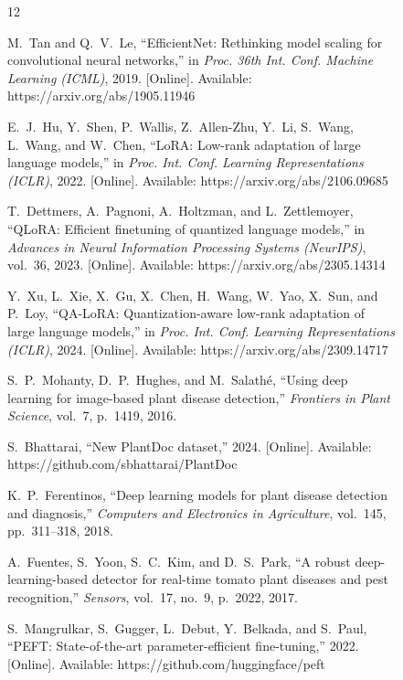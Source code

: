 \documentclass[conference]{IEEEtran}
\begin{document}
\begin{figure}[htbp]
\balance

\begin{thebibliography}{12}

M.~Tan and Q.~V.~Le,
``EfficientNet: Rethinking model scaling for convolutional neural networks,''
in \emph{Proc. 36th Int. Conf. Machine Learning (ICML)}, 2019.
[Online]. Available: https://arxiv.org/abs/1905.11946

E.~J.~Hu, Y.~Shen, P.~Wallis, Z.~Allen-Zhu, Y.~Li, S.~Wang, L.~Wang, and W.~Chen,
``LoRA: Low-rank adaptation of large language models,''
in \emph{Proc. Int. Conf. Learning Representations (ICLR)}, 2022.
[Online]. Available: https://arxiv.org/abs/2106.09685

T.~Dettmers, A.~Pagnoni, A.~Holtzman, and L.~Zettlemoyer,
``QLoRA: Efficient finetuning of quantized language models,''
in \emph{Advances in Neural Information Processing Systems (NeurIPS)}, vol.~36, 2023.
[Online]. Available: https://arxiv.org/abs/2305.14314

Y.~Xu, L.~Xie, X.~Gu, X.~Chen, H.~Wang, W.~Yao, X.~Sun, and P.~Loy,
``QA-LoRA: Quantization-aware low-rank adaptation of large language models,''
in \emph{Proc. Int. Conf. Learning Representations (ICLR)}, 2024.
[Online]. Available: https://arxiv.org/abs/2309.14717

S.~P.~Mohanty, D.~P.~Hughes, and M.~Salath\'{e},
``Using deep learning for image-based plant disease detection,''
\textit{Frontiers in Plant Science}, vol.~7, p.~1419, 2016.

S.~Bhattarai,
``New PlantDoc dataset,''
2024.
[Online]. Available: https://github.com/sbhattarai/PlantDoc

K.~P.~Ferentinos,
``Deep learning models for plant disease detection and diagnosis,''
\textit{Computers and Electronics in Agriculture}, vol.~145, pp.~311--318, 2018.

A.~Fuentes, S.~Yoon, S.~C.~Kim, and D.~S.~Park,
``A robust deep-learning-based detector for real-time tomato plant diseases and pest recognition,''
\textit{Sensors}, vol.~17, no.~9, p.~2022, 2017.

S.~Mangrulkar, S.~Gugger, L.~Debut, Y.~Belkada, and S.~Paul,
``PEFT: State-of-the-art parameter-efficient fine-tuning,''
2022.
[Online]. Available: https://github.com/huggingface/peft


\end{thebibliography}
\end{figure}
\end{document}
